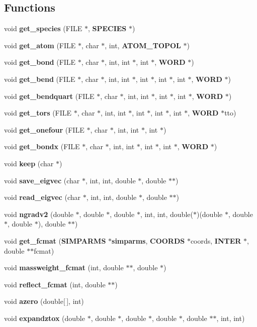 \subsection*{Functions}
\begin{CompactItemize}
\item 
void {\bf get\_\-species} (FILE $\ast$, {\bf SPECIES} $\ast$)
\item 
void {\bf get\_\-atom} (FILE $\ast$, char $\ast$, int, {\bf ATOM\_\-TOPOL} $\ast$)
\item 
void {\bf get\_\-bond} (FILE $\ast$, char $\ast$, int, int $\ast$, int $\ast$, {\bf WORD} $\ast$)
\item 
void {\bf get\_\-bend} (FILE $\ast$, char $\ast$, int, int $\ast$, int $\ast$, int $\ast$, int $\ast$, {\bf WORD} $\ast$)
\item 
void {\bf get\_\-bendquart} (FILE $\ast$, char $\ast$, int, int $\ast$, int $\ast$, int $\ast$, {\bf WORD} $\ast$)
\item 
void {\bf get\_\-tors} (FILE $\ast$, char $\ast$, int, int $\ast$, int $\ast$, int $\ast$, int $\ast$, {\bf WORD} $\ast$tto)
\item 
void {\bf get\_\-onefour} (FILE $\ast$, char $\ast$, int, int $\ast$, int $\ast$)
\item 
void {\bf get\_\-bondx} (FILE $\ast$, char $\ast$, int, int $\ast$, int $\ast$, int $\ast$, {\bf WORD} $\ast$)
\item 
void {\bf keep} (char $\ast$)
\item 
void {\bf save\_\-eigvec} (char $\ast$, int, int, double $\ast$, double $\ast$$\ast$)
\item 
void {\bf read\_\-eigvec} (char $\ast$, int, int, double $\ast$, double $\ast$$\ast$)
\item 
void {\bf ngradv2} (double $\ast$, double $\ast$, double $\ast$, int, int, double($\ast$)(double $\ast$, double $\ast$, double $\ast$), double $\ast$$\ast$)
\item 
void {\bf get\_\-fcmat} ({\bf SIMPARMS} $\ast${\bf simparms}, {\bf COORDS} $\ast$coords, {\bf INTER} $\ast$, double $\ast$$\ast$fcmat)
\item 
void {\bf massweight\_\-fcmat} (int, double $\ast$$\ast$, double $\ast$)
\item 
void {\bf reflect\_\-fcmat} (int, double $\ast$$\ast$)
\item 
void {\bf azero} (double[$\,$], int)
\item 
void {\bf expandztox} (double $\ast$, double $\ast$, double $\ast$, double $\ast$, double $\ast$$\ast$, int, int)
$$
\end{CompactItemize}
